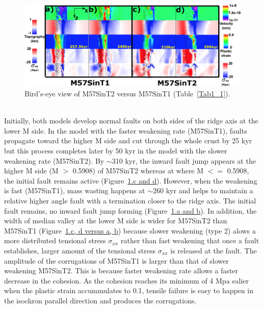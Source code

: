 \begin{figure}[h]
 \centering
  \includegraphics[width=1.0\textwidth]{./Figures/fig_Results_Weakening_2_M57SinT1VST2_CutbackVSsecondaryFault.eps}
 \caption{Bird's-eye view of M57SinT2 versus M57SinT1 (Table~\hyperref[Tab1_1]{\ref{Tab1_1}}).}
\label{fig_Results_Weakenging_2}
\end{figure}
~\\
Initially, both models develop normal faults on both sides of the ridge axis at the lower M side. In the model with the faster weakening rate (M57SinT1), faults propagate toward the higher M side and cut through the whole crust by 25 kyr but this process completes later by 50 kyr in the model with the slower weakening rate (M57SinT2). By $\sim$310 kyr, the inward fault jump appears at the higher M side (M $>$ 0.5908) of M57SinT2 whereas at where M $<=$ 0.5908, the initial fault remains active (Figure~\hyperref[fig_Results_Weakenging_2]{\ref{fig_Results_Weakenging_2}.c and d}). However, when the weakening is fast (M57SinT1), mass wasting happens at $\sim$260 kyr and helps to maintain a relative higher angle fault with a termination closer to the ridge axis. The initial fault remains, no inward fault jump forming (Figure~\hyperref[fig_Results_Weakenging_2]{\ref{fig_Results_Weakenging_2}.a and b}). In addition, the width of median valley at the lower M side is wider for M57SinT2 than M57SinT1 (Figure~\hyperref[fig_Results_Weakenging_2]{\ref{fig_Results_Weakenging_2}.c, d versus a, b}) because slower weakening (type 2) alows a more distributed tensional stress $\sigma_{xx}$ rather than fast weakening that once a fault establishes, larger amount of the tensional stress $\sigma_{xx}$ is released at the fault. The amplitude of the corrugations of M57SinT1 is larger than that of slower weakening M57SinT2. This is because faster weakening rate allows a faster decrease in the cohesion. As the cohesion reaches its minimum of 4 Mpa ealier when the plastic strain accummulates to 0.1, tensile failure is easy to happen in the isochron parallel direction and produces the corrugations.  

